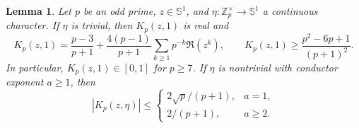 \documentclass[twoside]{aomart}
\theoremstyle{paperplain}
\newtheorem{lemma}[theorem]{Lemma}
\theoremstyle{paperdefinition}
\newcommand{\Z}{\mathbb Z}
\numberwithin{equation}{section}
\begin{document}
\begin{lemma}
\label{ar:local-factor-bounds}
Let $p$ be an odd prime, $z\in\mathbb S^1$, and
$\eta:\Z_p^\times\to\mathbb S^1$ a continuous character.
If $\eta$ is trivial, then $K_p(z,1)$ is real and
\begin{equation}
 K_p(z,1)=\frac{p-3}{p+1}+\frac{4(p-1)}{p+1}\sum_{k\ge1}p^{-k}\Re(z^k),\qquad K_p(z,1)\ge\frac{p^2-6p+1}{(p+1)^2}.
 \label{ar:principal-factor}
\end{equation}
In particular, $K_p(z,1)\in[0,1]$ for $p\ge7$.
If $\eta$ is nontrivial with conductor exponent $a\ge1$, then
\begin{equation}
 |K_p(z,\eta)|\le
 \begin{cases}2\sqrt p/(p+1),&a=1,\\2/(p+1),&a\ge2.
 \end{cases}
 \label{ar:nonprincipal-factor}
\end{equation}
\end{lemma}
\end{document}
